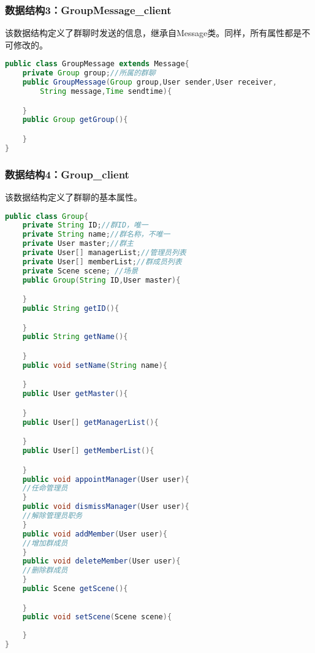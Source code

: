 \subsubsection{数据结构3：GroupMessage\_client}
该数据结构定义了群聊时发送的信息，继承自Message类。同样，所有属性都是不可修改的。
\begin{lstlisting}[language=Java, caption=GroupMessage定义]
public class GroupMessage extends Message{
    private Group group;//所属的群聊
    public GroupMessage(Group group,User sender,User receiver,
        String message,Time sendtime){

    }
    public Group getGroup(){

    }
}
\end{lstlisting}

\subsubsection{数据结构4：Group\_client}
该数据结构定义了群聊的基本属性。
\begin{lstlisting}[language=Java, caption=Group定义]
public class Group{
    private String ID;//群ID，唯一
    private String name;//群名称，不唯一
    private User master;//群主
    private User[] managerList;//管理员列表
    private User[] memberList;//群成员列表
    private Scene scene; //场景
    public Group(String ID,User master){

    }
    public String getID(){

    }
    public String getName(){

    }
    public void setName(String name){

    }
    public User getMaster(){

    }
    public User[] getManagerList(){

    }
    public User[] getMemberList(){

    }
    public void appointManager(User user){
    //任命管理员
    }
    public void dismissManager(User user){
    //解除管理员职务
    }
    public void addMember(User user){
    //增加群成员
    }
    public void deleteMember(User user){
    //删除群成员
    }
    public Scene getScene(){

    }
    public void setScene(Scene scene){
        
    }
}
\end{lstlisting}


